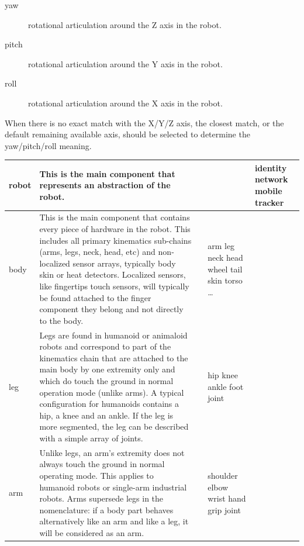 \begin{description}
\item[yaw] rotational articulation around the Z axis in the robot.
\item[pitch] rotational articulation around the Y axis in the robot.
\item[roll] rotational articulation around the X axis in the robot.
\end{description}

When there is no exact match with the X/Y/Z axis, the closest match, or
the default remaining available axis, should be selected to determine
the yaw/pitch/roll meaning.

\begin{center}
\begin{supertabular}{|m{2.312cm}|m{6.776cm}|m{2.629cm}|m{2.471cm}|m{2.1269999cm}|}
robot &
This is the main component that
represents an abstraction of the robot. &
\code{{}-} &
 &
\ttfamily identity network mobile
tracker\\\hline
body &
This is the main component that
contains every piece of hardware in the robot. This includes all
primary kinematics sub-chains (arms, legs, neck, head, etc) and
non-localized sensor arrays, typically body skin or heat detectors.
Localized sensors, like fingertips touch sensors, will typically be
found attached to the finger component they belong and not directly to
the body.  &
 &
\ttfamily arm leg neck head wheel tail skin
torso … &
\code{{}-} \\\hline
leg &
Legs are found in humanoid or
animaloid robots and correspond to part of the kinematics chain that
are attached to the main body by one extremity only and which do touch
the ground in normal operation mode (unlike arms). A typical
configuration for humanoids contains a hip, a knee and an ankle. If the
leg is more segmented, the leg can be described with a simple array of
joints. &
 &
hip knee ankle foot joint &
\code{{}-} \\\hline
arm &
Unlike legs, an arm’s extremity does
not always touch the ground in normal operating mode. This applies to
humanoid robots or single-arm industrial robots. Arms supersede legs in
the nomenclature: if a body part behaves alternatively like an arm and
like a leg, it will be considered as an arm. &
 &
shoulder elbow wrist hand grip  joint &

\end{supertabular}
\end{center}
